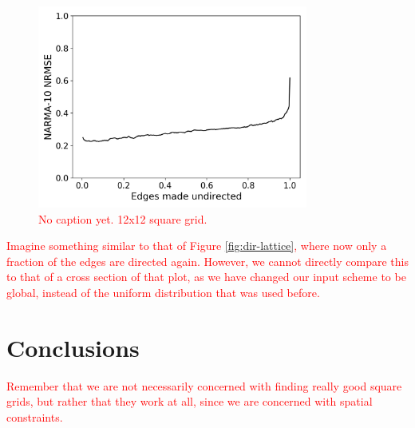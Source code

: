 \begin{figure}
  \centering
  \includegraphics[width=3.5in]{figures/undir-performance.png}
  \caption{
    \textcolor{red}{
      No caption yet. 12x12 square grid.
    }
  }
  \label{fig:undirection-performance}
\end{figure}

\textcolor{red}{
  Imagine something similar to that of Figure \ref{fig:dir-lattice}, where now
only a fraction of the edges are directed again. However, we cannot directly
compare this to that of a cross section of that plot, as we have changed our
input scheme to be global, instead of the uniform distribution that was used
before.
}

\section{Conclusions}

\textcolor{red}{
  Remember that we are not necessarily concerned with finding really good square
grids, but rather that they work at all, since we are concerned with spatial
constraints.
}


